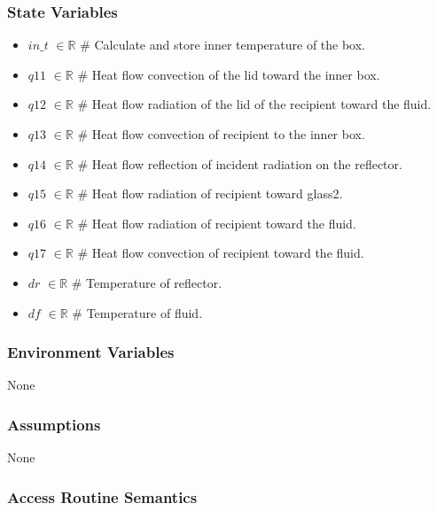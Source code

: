 \documentclass[12pt, titlepage]{article}
\begin{document}
\subsubsection{State Variables}
\begin{itemize}
    \item $in\_t$ $\in \mathbb{R}$   \# Calculate and store inner temperature of the box. 
    \item $q11$ $\in \mathbb{R}$ \# Heat flow convection of the lid toward the inner box. 
    \item $q12$ $\in \mathbb{R}$ \# Heat flow radiation of the lid of the recipient toward the fluid.
    \item $q13$ $\in \mathbb{R}$ \# Heat flow convection of recipient to the inner box.
    \item $q14$ $\in \mathbb{R}$ \# Heat flow reflection of incident radiation on the reflector. 
    \item $q15$ $\in \mathbb{R}$ \# Heat flow radiation of recipient toward glass2. 
    \item $q16$ $\in \mathbb{R}$ \# Heat flow radiation of recipient toward the fluid. 
    \item $q17$ $\in \mathbb{R}$ \# Heat flow convection of recipient toward the fluid. 
    \item $dr$ $\in \mathbb{R}$ \# Temperature of reflector. 
    \item $df$ $\in \mathbb{R}$ \# Temperature of fluid. 
\end{itemize}


 

\subsubsection{Environment Variables}

None

\subsubsection{Assumptions}

None

\subsubsection{Access Routine Semantics}
\end{document}
